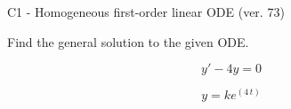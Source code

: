 \begin{exercise}
  \begin{exerciseTitle}C1 - Homogeneous first-order linear ODE (ver. 73)\end{exerciseTitle}
  \begin{exerciseStatement}
    
Find the general solution to the given ODE.

    
\[y'-4y=0\]

  \end{exerciseStatement}
  \begin{exerciseAnswer}
    
\[y= k e^{\left(4 \, t\right)}\]

  \end{exerciseAnswer}
\end{exercise}